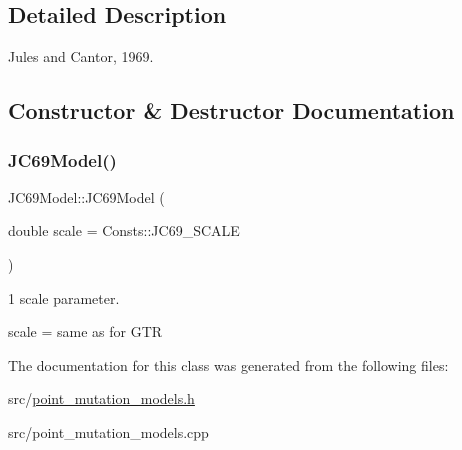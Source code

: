 \subsection{Detailed Description}
Jules and Cantor, 1969. 

\subsection{Constructor \& Destructor Documentation}
\mbox{\label{classretrocombinator_1_1JC69Model_ab28021c22ed997738e2eac2f280930a5}} 
\subsubsection{\texorpdfstring{J\+C69\+Model()}{JC69Model()}}
{\footnotesize\ttfamily J\+C69\+Model\+::\+J\+C69\+Model (\begin{DoxyParamCaption}\item[{double}]{scale = {\ttfamily Consts\+:\+:JC69\+\_\+SCALE} }\end{DoxyParamCaption})}



1 scale parameter. 

scale = same as for G\+TR 

The documentation for this class was generated from the following files\+:\begin{DoxyCompactItemize}
\item 
src/\hyperlink{point__mutation__models_8h}{point\+\_\+mutation\+\_\+models.\+h}\item 
src/point\+\_\+mutation\+\_\+models.\+cpp\end{DoxyCompactItemize}
